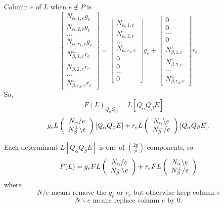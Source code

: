 \documentclass{beamer}
\begin{document}
\begin{frame}
  Column $e$ of $L$ when $e\not\in P$ is
\[
\left[\begin{array}{c}
    N_{\alpha,1,e}g_e\\
    N_{\alpha,2,e}g_e\\
    ...\\
    N_{\alpha,r_1,e}g_e\\
    N_{\beta,1,e}^\perp r_e\\
    N_{\beta,2,e}^\perp r_e\\
    ...\\
    N_{\beta,r_2,e}^\perp r_e
  \end{array}\right]
=
\left[\begin{array}{c}
    N_{\alpha,1,e}\\
    N_{\alpha,2,e}\\
    ...\\
    N_{\alpha,r_1,e}\\
    0\\
    0\\
    ...\\
    0
  \end{array}\right]g_e
+
\left[\begin{array}{c}
    0\\
    0\\
    ...\\
    0\\
    N_{\beta,1,e}^\perp \\
    N_{\beta,2,e}^\perp\\
    ...\\
    N_{\beta,r_2,e}^\perp
  \end{array}\right]r_e
\]
So, 
\[
F(L)_{Q_\alpha Q_\beta } = L[Q_\alpha Q_\beta E ] =
\]
\[
g_eL\left(\begin{array}{c} N_{\alpha}/e\\ N_{\beta}^{\perp}\backslash e \end{array} \right)[Q_\alpha Q_\beta E]
+
r_eL\left(\begin{array}{c} N_{\alpha}\backslash e\\ N_{\beta}^{\perp}/e \end{array} \right)[Q_\alpha Q_\beta E].
\]
\end{frame}

\begin{frame}
  Each determinant $L[Q_\alpha Q_\beta E]$ is one of $\binom{2p}{p}$ components, so
  \[
  F(L) =
  g_eFL\left(\begin{array}{c} N_{\alpha}/e\\ N_{\beta}^{\perp}\backslash e \end{array} \right)
+
r_eFL\left(\begin{array}{c} N_{\alpha}\backslash e\\ N_{\beta}^{\perp}/e \end{array} \right)
\]
where
\[
N/e \text{\ means remove the\ } g_e \text{\ or\ } r_e \text{\ but otherwise keep column\ }e
\]
\[
N\backslash e \text{\ means replace column\ }e\text{\ by\ }0.
\]
\end{frame}
\end{document}
